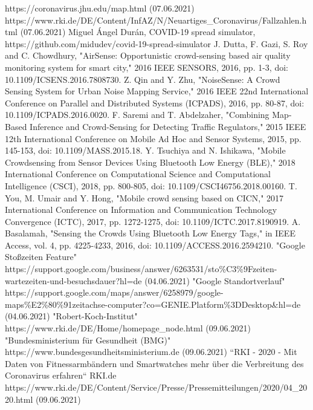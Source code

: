 \documentclass[conference]{IEEEtran}
\begin{document}
\begin{thebibliography}{00}
 https://coronavirus.jhu.edu/map.html (07.06.2021)
 https://www.rki.de/DE/Content/InfAZ/N/Neuartiges\_Coronavirus/Fallzahlen.html (07.06.2021)
 Miguel Ángel Durán, COVID-19 spread simulator, 
https://github.com/midudev/covid-19-spread-simulator
 J. Dutta, F. Gazi, S. Roy and C. Chowdhury, "AirSense: Opportunistic crowd-sensing based air quality monitoring system for smart city," 2016 IEEE SENSORS, 2016, pp. 1-3, doi: 10.1109/ICSENS.2016.7808730.
 Z. Qin and Y. Zhu, "NoiseSense: A Crowd Sensing System for Urban Noise Mapping Service," 2016 IEEE 22nd International Conference on Parallel and Distributed Systems (ICPADS), 2016, pp. 80-87, doi: 10.1109/ICPADS.2016.0020.
 F. Saremi and T. Abdelzaher, "Combining Map-Based Inference and Crowd-Sensing for Detecting Traffic Regulators," 2015 IEEE 12th International Conference on Mobile Ad Hoc and Sensor Systems, 2015, pp. 145-153, doi: 10.1109/MASS.2015.18.
 Y. Tsuchiya and N. Ishikawa, "Mobile Crowdsensing from Sensor Devices Using Bluetooth Low Energy (BLE)," 2018 International Conference on Computational Science and Computational Intelligence (CSCI), 2018, pp. 800-805, doi: 10.1109/CSCI46756.2018.00160.
 T. You, M. Umair and Y. Hong, "Mobile crowd sensing based on CICN," 2017 International Conference on Information and Communication Technology Convergence (ICTC), 2017, pp. 1272-1275, doi: 10.1109/ICTC.2017.8190919.
 A. Basalamah, "Sensing the Crowds Using Bluetooth Low Energy Tags," in IEEE Access, vol. 4, pp. 4225-4233, 2016, doi: 10.1109/ACCESS.2016.2594210.
 "Google Stoßzeiten Feature" \\ https://support.google.com/business/answer/6263531/sto\%C3\%9Fzeiten-wartezeiten-und-besuchsdauer?hl=de (04.06.2021)
 "Google Standortverlauf" \\ https://support.google.com/maps/answer/6258979/google-maps\%E2\%80\%91zeitachse-computer?co=GENIE.Platform\%3DDesktop\&hl=de (04.06.2021)
 "Robert-Koch-Institut" \\ https://www.rki.de/DE/Home/homepage\_node.html (09.06.2021)
 "Bundesministerium für Gesundheit (BMG)" \\ https://www.bundesgesundheitsministerium.de (09.06.2021)
 “RKI - 2020 - Mit Daten von Fitnessarmbändern und Smartwatches mehr über die Verbreitung des Coronavirus erfahren“ RKI.de \\ https://www.rki.de/DE/Content/Service/Presse/Pressemitteilungen/2020/04\_2020.html (09.06.2021)

\end{thebibliography}
\end{document}
